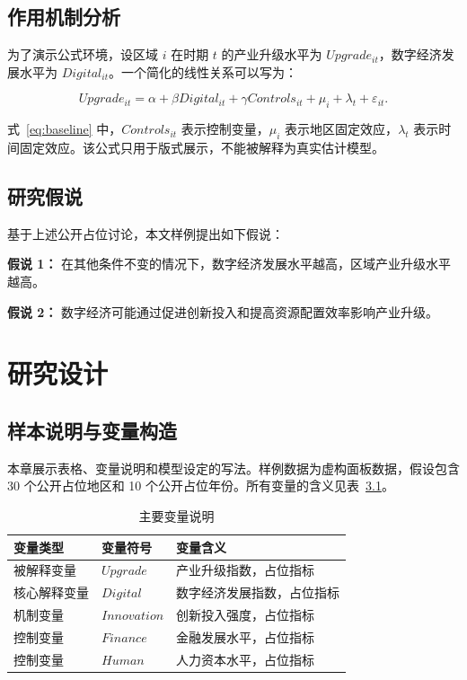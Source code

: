 \documentclass[12pt]{ctexbook}
\begin{document}
\section{作用机制分析}
为了演示公式环境，设区域 $i$ 在时期 $t$ 的产业升级水平为 $Upgrade_{it}$，数字经济发展水平为 $Digital_{it}$。一个简化的线性关系可以写为：

\begin{equation}
Upgrade_{it}=\alpha+\beta Digital_{it}+\gamma Controls_{it}+\mu_i+\lambda_t+\varepsilon_{it}.
\label{eq:baseline}
\end{equation}

式~\ref{eq:baseline} 中，$Controls_{it}$ 表示控制变量，$\mu_i$ 表示地区固定效应，$\lambda_t$ 表示时间固定效应。该公式只用于版式展示，不能被解释为真实估计模型。

\section{研究假说}
基于上述公开占位讨论，本文样例提出如下假说：

\textbf{假说 1：} 在其他条件不变的情况下，数字经济发展水平越高，区域产业升级水平越高。

\textbf{假说 2：} 数字经济可能通过促进创新投入和提高资源配置效率影响产业升级。

\chapter{研究设计}
\section{样本说明与变量构造}
本章展示表格、变量说明和模型设定的写法。样例数据为虚构面板数据，假设包含 30 个公开占位地区和 10 个公开占位年份。所有变量的含义见表~\ref{tab:variables}。

\begin{table}[htbp]
\centering
\caption{主要变量说明}
\label{tab:variables}
\begin{tabular}{lll}
\toprule
变量类型 & 变量符号 & 变量含义 \\
\midrule
被解释变量 & $Upgrade$ & 产业升级指数，占位指标 \\
核心解释变量 & $Digital$ & 数字经济发展指数，占位指标 \\
机制变量 & $Innovation$ & 创新投入强度，占位指标 \\
控制变量 & $Finance$ & 金融发展水平，占位指标 \\
控制变量 & $Human$ & 人力资本水平，占位指标 \\
\bottomrule
\end{tabular}
\end{table}
\end{document}
